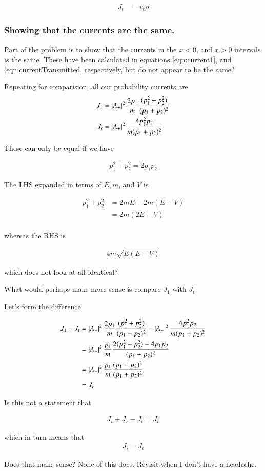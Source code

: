 \documentclass{article}
\begin{document}
\begin{align*}
J_t &= v_t \rho
\end{align*}

\subsubsection{ Showing that the currents are the same. }

Part of the problem is to show that the currents in the $x<0$, and $x>0$
intervals is the same.  These have been calculated in equations
\ref{eqn:current1}, and
\ref{eqn:currentTransmitted} respectively, but do not appear to be the same?

Repeating for comparision, all our probability currents are
\begin{align*}
J_1
&=
\left\lvert{A_{+}}\right\rvert^2 
\frac{2 p_1}{m} 
\frac{ (p_1^2 + p_2^2) }{(p_1 + p_2)^2} \\
J_t &= 
\left\lvert{ A_{+} }\right\rvert^2
\frac{ 4 p_1^2 p_2 
}{m (p_1 + p_2)^2}
\end{align*}


These can only be equal if we have

\begin{align*}
p_1^2 + p_2^2 = 2 p_1 p_2
\end{align*}

The LHS expanded in terms of $E, m$, and $V$ is

\begin{align*}
p_1^2 + p_2^2 
&=
2m E + 2m (E - V) \\
&=
2m (2 E - V) \\
\end{align*}

whereas the RHS is

\begin{align*}
4 m \sqrt{E (E-V)}
\end{align*}

which does not look at all identical?

What would perhaps make more sense is compare $J_1$ with $J_t$.  

Let's form the difference

\begin{align*}
J_1 - J_t 
&=
\left\lvert{A_{+}}\right\rvert^2 
\frac{2 p_1}{m} 
\frac{ (p_1^2 + p_2^2) }{(p_1 + p_2)^2} 
-
\left\lvert{ A_{+} }\right\rvert^2
\frac{ 4 p_1^2 p_2 
}{m (p_1 + p_2)^2} 
\\
&=
\left\lvert{ A_{+} }\right\rvert^2 
\frac{ p_1}{m}  
\frac{
2 (p_1^2 + p_2^2) - 4 p_1 p_2 
} { (p_1 + p_2)^2}
\\
&=
\left\lvert{ A_{+} }\right\rvert^2 
\frac{ p_1}{m}  
\frac{ (p_1 - p_2)^2} { (p_1 + p_2)^2} 
\\
&= J_r
\end{align*}

Is this not a statement that

\begin{align*}
J_i + J_r - J_t = J_r
\end{align*}

which in turn means that
\begin{align*}
J_i = J_t
\end{align*}

Does that make sense?  None of this does.  Revisit when I don't have a headache.



\end{document}

